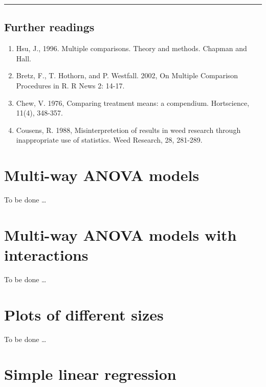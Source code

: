 \documentclass[a4paper,12pt,oneside]{book}
\providecommand{\tightlist}{%
  \setlength{\itemsep}{0pt}\setlength{\parskip}{0pt}}
\begin{document}
\begin{center}\rule{0.5\linewidth}{0.5pt}\end{center}

\hypertarget{further-readings-7}{%
\section{Further readings}\label{further-readings-7}}

\begin{enumerate}
\def\labelenumi{\arabic{enumi}.}
\tightlist
\item
  Hsu, J., 1996. Multiple comparisons. Theory and methods. Chapman and Hall.
\item
  Bretz, F., T. Hothorn, and P. Westfall. 2002, On Multiple Comparison Procedures in R. R News 2: 14-17.
\item
  Chew, V. 1976, Comparing treatment means: a compendium. Hortscience, 11(4), 348-357.
\item
  Cousens, R. 1988, Misinterpretetion of results in weed research through inappropriate use of statistics. Weed Research, 28, 281-289.
\end{enumerate}

\hypertarget{multi-way-anova-models}{%
\chapter{Multi-way ANOVA models}\label{multi-way-anova-models}}

To be done \ldots{}

\hypertarget{multi-way-anova-models-with-interactions}{%
\chapter{Multi-way ANOVA models with interactions}\label{multi-way-anova-models-with-interactions}}

To be done \ldots{}

\hypertarget{plots-of-different-sizes}{%
\chapter{Plots of different sizes}\label{plots-of-different-sizes}}

To be done \ldots{}

\hypertarget{simple-linear-regression}{%
\chapter{Simple linear regression}\label{simple-linear-regression}}
\end{document}
